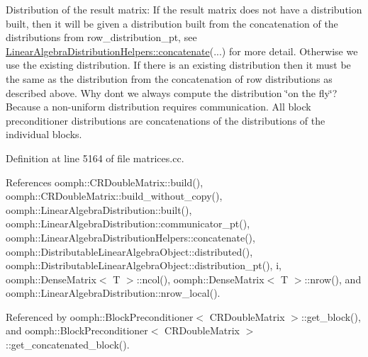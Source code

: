Distribution of the result matrix\+: If the result matrix does not have a distribution built, then it will be given a distribution built from the concatenation of the distributions from row\+\_\+distribution\+\_\+pt, see \hyperlink{namespaceoomph_1_1LinearAlgebraDistributionHelpers_ad3ba423fba64e7db91e9155efa7df5d0}{Linear\+Algebra\+Distribution\+Helpers\+::concatenate}(...) for more detail. Otherwise we use the existing distribution. If there is an existing distribution then it must be the same as the distribution from the concatenation of row distributions as described above. Why don\textquotesingle{}t we always compute the distribution \char`\"{}on the fly\char`\"{}? Because a non-\/uniform distribution requires communication. All block preconditioner distributions are concatenations of the distributions of the individual blocks. 

Definition at line 5164 of file matrices.\+cc.



References oomph\+::\+C\+R\+Double\+Matrix\+::build(), oomph\+::\+C\+R\+Double\+Matrix\+::build\+\_\+without\+\_\+copy(), oomph\+::\+Linear\+Algebra\+Distribution\+::built(), oomph\+::\+Linear\+Algebra\+Distribution\+::communicator\+\_\+pt(), oomph\+::\+Linear\+Algebra\+Distribution\+Helpers\+::concatenate(), oomph\+::\+Distributable\+Linear\+Algebra\+Object\+::distributed(), oomph\+::\+Distributable\+Linear\+Algebra\+Object\+::distribution\+\_\+pt(), i, oomph\+::\+Dense\+Matrix$<$ T $>$\+::ncol(), oomph\+::\+Dense\+Matrix$<$ T $>$\+::nrow(), and oomph\+::\+Linear\+Algebra\+Distribution\+::nrow\+\_\+local().



Referenced by oomph\+::\+Block\+Preconditioner$<$ C\+R\+Double\+Matrix $>$\+::get\+\_\+block(), and oomph\+::\+Block\+Preconditioner$<$ C\+R\+Double\+Matrix $>$\+::get\+\_\+concatenated\+\_\+block().

\mbox{\label{namespaceoomph_1_1CRDoubleMatrixHelpers_a53d5c536ca841d3d4fae5feb78448b0a}} 
